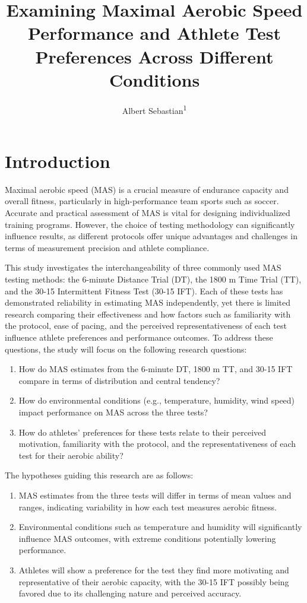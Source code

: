 \documentclass[
  man]{apa6}
\title{Examining Maximal Aerobic Speed Performance and Athlete Test Preferences Across Different Conditions}
\author{Albert Sebastian\textsuperscript{1}}
\date{}
\affiliation{\vspace{0.5cm}\textsuperscript{1} Rutgers University}
\begin{document}
\maketitle

\section{Introduction}\label{introduction}

Maximal aerobic speed (MAS) is a crucial measure of endurance capacity and overall fitness, particularly in high-performance team sports such as soccer. Accurate and practical assessment of MAS is vital for designing individualized training programs. However, the choice of testing methodology can significantly influence results, as different protocols offer unique advantages and challenges in terms of measurement precision and athlete compliance.

This study investigates the interchangeability of three commonly used MAS testing methods: the 6-minute Distance Trial (DT), the 1800 m Time Trial (TT), and the 30-15 Intermittent Fitness Test (30-15 IFT). Each of these tests has demonstrated reliability in estimating MAS independently, yet there is limited research comparing their effectiveness and how factors such as familiarity with the protocol, ease of pacing, and the perceived representativeness of each test influence athlete preferences and performance outcomes. To address these questions, the study will focus on the following research questions:

\begin{enumerate}
\def\labelenumi{\arabic{enumi}.}
\item
  How do MAS estimates from the 6-minute DT, 1800 m TT, and 30-15 IFT compare in terms of distribution and central tendency?
\item
  How do environmental conditions (e.g., temperature, humidity, wind speed) impact performance on MAS across the three tests?
\item
  How do athletes' preferences for these tests relate to their perceived motivation, familiarity with the protocol, and the representativeness of each test for their aerobic ability?
\end{enumerate}

The hypotheses guiding this research are as follows:

\begin{enumerate}
\def\labelenumi{\arabic{enumi}.}
\item
  MAS estimates from the three tests will differ in terms of mean values and ranges, indicating variability in how each test measures aerobic fitness.
\item
  Environmental conditions such as temperature and humidity will significantly influence MAS outcomes, with extreme conditions potentially lowering performance.
\item
  Athletes will show a preference for the test they find more motivating and representative of their aerobic capacity, with the 30-15 IFT possibly being favored due to its challenging nature and perceived accuracy.
\end{enumerate}
\end{document}
